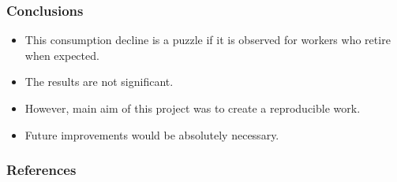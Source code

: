 \documentclass[11pt]{beamer}
\begin{document}
\begin{frame}[t]
    \frametitle{Conclusions}
    \begin{itemize}
        \item This consumption decline is a puzzle if it is observed for workers who retire when expected.
        \item The results are not significant.
        \item However, main aim of this project was to create a reproducible work.
        \item Future improvements would be absolutely necessary.
   \end{itemize}
    \note{~}
\end{frame}

\begin{frame}[allowframebreaks]
    \frametitle{References}
    \nocite{*}
    
\end{frame}
\end{document}
